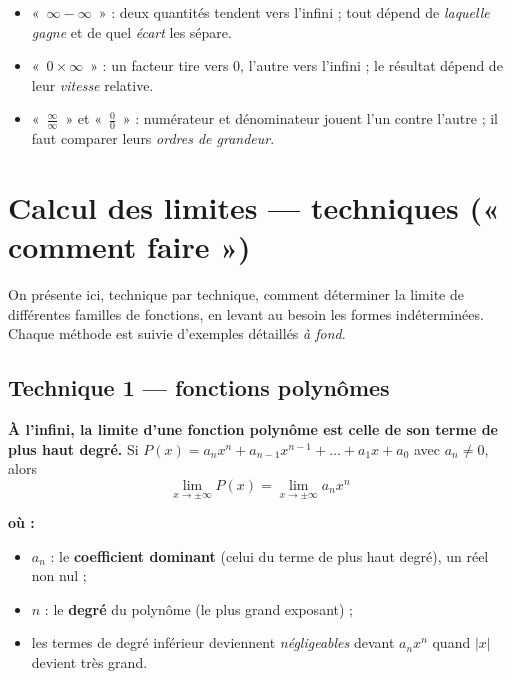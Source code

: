 \documentclass[11pt,a4paper]{article}
\newenvironment{ou}{%
  \par\smallskip\noindent\textbf{où :}\nopagebreak
  \begin{itemize}[leftmargin=1.8em,topsep=2pt,itemsep=1.5pt,parsep=0pt]}%
  {\end{itemize}}
\begin{document}
\begin{remarque}
\begin{itemize}[leftmargin=1.6em,topsep=2pt]
  \item «~$\infty-\infty$~» : deux quantités tendent vers l'infini ; tout dépend de \emph{laquelle gagne} et de quel \emph{écart} les sépare.
  \item «~$0\times\infty$~» : un facteur tire vers $0$, l'autre vers l'infini ; le résultat dépend de leur \emph{vitesse} relative.
  \item «~$\tfrac{\infty}{\infty}$~» et «~$\tfrac{0}{0}$~» : numérateur et dénominateur jouent l'un contre l'autre ; il faut comparer leurs \emph{ordres de grandeur}.
\end{itemize}
\end{remarque}

\section{Calcul des limites — techniques (« comment faire »)}
\label{sec:calcul}
On présente ici, technique par technique, comment déterminer la limite de différentes familles de
fonctions, en levant au besoin les formes indéterminées. Chaque méthode est suivie d'exemples
détaillés \emph{à fond}.

\subsection{Technique 1 — fonctions polynômes}

\begin{theoreme}
\textbf{À l'infini, la limite d'une fonction polynôme est celle de son terme de plus haut degré.}
Si $P(x)=a_n x^n+a_{n-1}x^{n-1}+\dots+a_1 x+a_0$ avec $a_n\neq 0$, alors
\[ \boxed{\ \lim_{x\to\pm\infty} P(x)=\lim_{x\to\pm\infty} a_n x^{n}\ } \]
\end{theoreme}

\begin{ou}
  \item $a_n$ : le \textbf{coefficient dominant} (celui du terme de plus haut degré), un réel non nul ;
  \item $n$ : le \textbf{degré} du polynôme (le plus grand exposant) ;
  \item les termes de degré inférieur deviennent \emph{négligeables} devant $a_n x^n$ quand $|x|$ devient très grand.
\end{ou}
\end{document}
